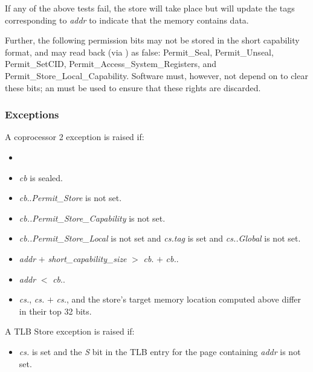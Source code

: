 If any of the above tests fail, the store will take place but will update
the tags corresponding to \emph{addr} to indicate that the memory contains
data.

Further, the following permission bits may not be stored in the short
capability format, and may read back (via ) as false:
Permit\_Seal, Permit\_Unseal, Permit\_SetCID,
Permit\_Access\_System\_Registers, and Permit\_Store\_Local\_Capability.
Software must, however, not depend on  to clear these
bits; an  must be used to ensure that these rights
are discarded.


\subsubsection*{Exceptions}

A coprocessor 2 exception is raised if:

\begin{itemize}
\item
\cchecktag{}
\item
\emph{cb} is sealed.
\item
\emph{cb}.\cperms.\emph{Permit\_Store} is not set.
\item
\emph{cb.\cperms.Permit\_Store\_Capability} is not set.
\item
\emph{cb.\cperms{}.Permit\_Store\_Local} is not set and
\emph{cs.tag} is set and \emph{cs.\cperms{}.Global} is not set.
\item
\emph{addr} $+$ \emph{short\_capability\_size} $>$ \emph{cb}.\cbase{} $+$ \emph{cb.\clength{}}.
\item
\emph{addr} $<$ \emph{cb}.\cbase{}.
\item
\emph{cs.\cbase{}}, \emph{cs.\cbase{}} $+$ \emph{cs.\clength{}}, and
the store's target memory location computed above differ in their top 32 bits.
\end{itemize}

\noindent
A TLB Store exception is raised if:

\begin{itemize}
\item
\emph{cs.\ctag{}} is set and the \emph{S} bit in the TLB entry for the page
containing \emph{addr} is not set.
\end{itemize}

